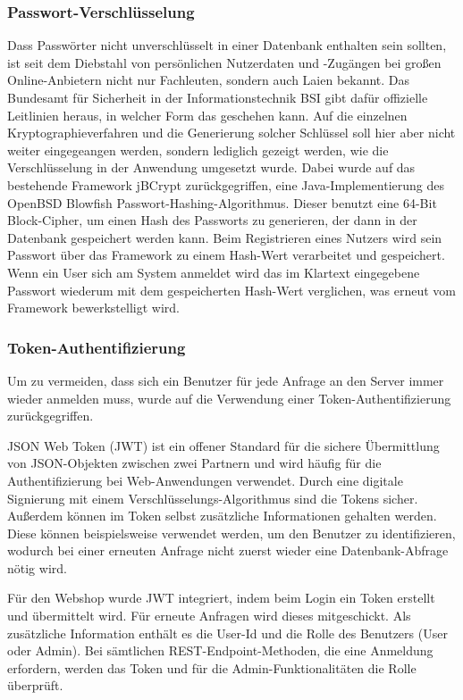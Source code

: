 \subsubsection{Passwort-Verschlüsselung}
Dass Passwörter nicht unverschlüsselt in einer Datenbank enthalten sein sollten, ist seit dem Diebstahl von persönlichen Nutzerdaten und -Zugängen bei großen Online-Anbietern nicht nur Fachleuten, sondern auch Laien bekannt.
Das Bundesamt für Sicherheit in der Informationstechnik \acs{BSI} gibt dafür offizielle Leitlinien heraus, in welcher Form das geschehen kann. \cite{BSI2016}
Auf die einzelnen Kryptographieverfahren und die Generierung solcher Schlüssel soll hier aber nicht weiter eingegeangen werden, sondern lediglich gezeigt werden, wie die Verschlüsselung in der Anwendung umgesetzt wurde.
Dabei wurde auf das bestehende Framework jBCrypt zurückgegriffen, eine Java-Implementierung des OpenBSD Blowfish Passwort-Hashing-Algorithmus. \cite{jBCrypt2015}
Dieser benutzt eine 64-Bit Block-Cipher, um einen Hash des Passworts zu generieren, der dann in der Datenbank gespeichert werden kann. \cite{Provos}
Beim Registrieren eines Nutzers wird sein Passwort über das Framework zu einem Hash-Wert verarbeitet und gespeichert.
Wenn ein User sich am System anmeldet wird das im Klartext eingegebene Passwort wiederum mit dem gespeicherten Hash-Wert verglichen, was erneut vom Framework bewerkstelligt wird.
\subsubsection{Token-Authentifizierung}
Um zu vermeiden, dass sich ein Benutzer für jede Anfrage an den Server immer wieder anmelden muss, wurde auf die Verwendung einer Token-Authentifizierung zurückgegriffen.

\acs{JSON} Web Token (\acs{JWT}) ist ein offener Standard für die sichere Übermittlung von \acs{JSON}-Objekten zwischen zwei Partnern und wird häufig für die Authentifizierung bei Web-Anwendungen verwendet.
Durch eine digitale Signierung mit einem Verschlüsselungs-Algorithmus sind die Tokens sicher. Außerdem können im Token selbst zusätzliche Informationen gehalten werden.
Diese können beispielsweise verwendet werden, um den Benutzer zu identifizieren, wodurch bei einer erneuten Anfrage nicht zuerst wieder eine Datenbank-Abfrage nötig wird. \cite{Auth02016}

Für den Webshop wurde \acs{JWT} integriert, indem beim Login ein Token erstellt und übermittelt wird. Für erneute Anfragen wird dieses mitgeschickt. Als zusätzliche Information enthält es die User-Id und die Rolle des Benutzers (User oder Admin).
Bei sämtlichen REST-Endpoint-Methoden, die eine Anmeldung erfordern, werden das Token und für die Admin-Funktionalitäten die Rolle überprüft.
